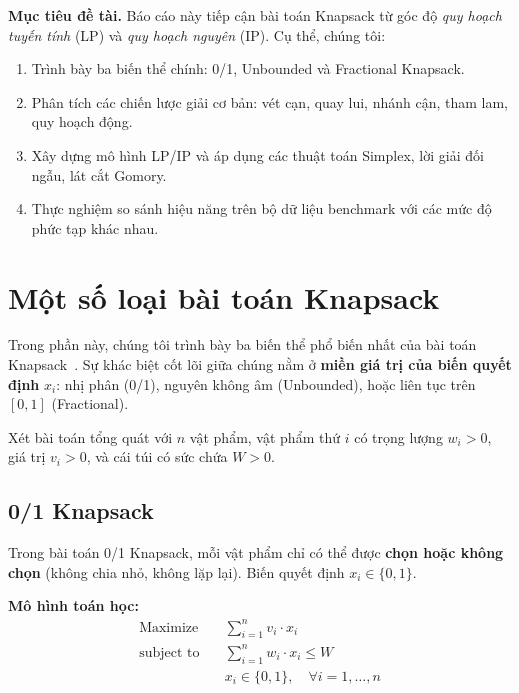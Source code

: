 \documentclass[fontsize=13pt,a4paper]{report}
\begin{document}
\textbf{Mục tiêu đề tài.} Báo cáo này tiếp cận bài toán Knapsack từ góc độ \textit{quy hoạch tuyến tính} (LP) và \textit{quy hoạch nguyên} (IP). Cụ thể, chúng tôi:
\begin{enumerate}[noitemsep]
    \item Trình bày ba biến thể chính: 0/1, Unbounded và Fractional Knapsack.
    \item Phân tích các chiến lược giải cơ bản: vét cạn, quay lui, nhánh cận, tham lam, quy hoạch động.
    \item Xây dựng mô hình LP/IP và áp dụng các thuật toán Simplex, lời giải đối ngẫu, lát cắt Gomory.
    \item Thực nghiệm so sánh hiệu năng trên bộ dữ liệu benchmark với các mức độ phức tạp khác nhau.
\end{enumerate}


\section{Một số loại bài toán Knapsack}
\label{sec:knapsack_intro}

Trong phần này, chúng tôi trình bày ba biến thể phổ biến nhất của bài toán Knapsack~\cite{kellerer2004knapsack}. Sự khác biệt cốt lõi giữa chúng nằm ở \textbf{miền giá trị của biến quyết định} $x_i$: nhị phân (0/1), nguyên không âm (Unbounded), hoặc liên tục trên $[0,1]$ (Fractional).

Xét bài toán tổng quát với $n$ vật phẩm, vật phẩm thứ $i$ có trọng lượng $w_i > 0$, giá trị $v_i > 0$, và cái túi có sức chứa $W > 0$.


\subsection{0/1 Knapsack}

Trong bài toán 0/1 Knapsack, mỗi vật phẩm chỉ có thể được \textbf{chọn hoặc không chọn} (không chia nhỏ, không lặp lại). Biến quyết định $x_i \in \{0, 1\}$.

\textbf{Mô hình toán học:}
\begin{align}
    \text{Maximize} \quad & \sum_{i=1}^{n} v_i \cdot x_i \label{eq:01obj} \\
    \text{subject to} \quad & \sum_{i=1}^{n} w_i \cdot x_i \leq W \label{eq:01cap} \\
    & x_i \in \{0, 1\}, \quad \forall i = 1, \ldots, n \label{eq:01bin}
\end{align}
\end{document}
